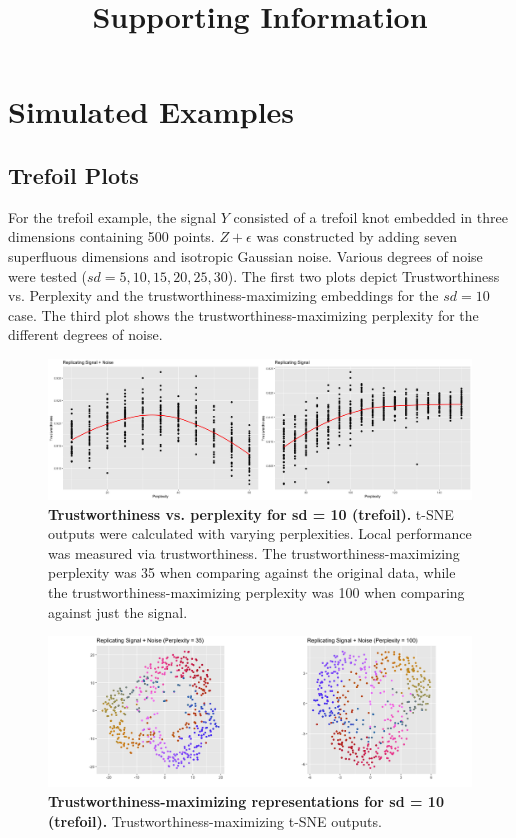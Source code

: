\documentclass{article}
\title{Supporting Information}
\date{}
\begin{document}
\maketitle		

\setcounter{section}{0}
\setcounter{figure}{0}
\renewcommand{\thesection}{S\Roman{section}}
\renewcommand{\thefigure}{S\arabic{figure}}

\section{Simulated Examples}
\subsection{Trefoil Plots}
For the trefoil example, the signal $Y$ consisted of a trefoil knot embedded in three dimensions containing 500 points. $Z + \epsilon$ was constructed by adding seven superfluous dimensions and isotropic Gaussian noise. Various degrees of noise were tested ($sd = 5, 10, 15, 20, 25, 30$). The first two plots depict Trustworthiness vs. Perplexity and the trustworthiness-maximizing embeddings for the $sd = 10$ case. The third plot shows the trustworthiness-maximizing perplexity for the different degrees of noise.

\begin{figure}[!h]
\centering
\includegraphics[scale=0.85]{Fig S1}
\caption{{\bf Trustworthiness vs. perplexity for sd = 10 (trefoil).}
t-SNE outputs were calculated with varying perplexities. Local performance was measured via trustworthiness. The trustworthiness-maximizing perplexity was 35 when comparing against the original data, while the trustworthiness-maximizing perplexity was 100 when comparing against just the signal.}
\end{figure}

\begin{figure}[H]
\centering
\includegraphics[scale=1.2]{Fig S2}
\caption{{\bf Trustworthiness-maximizing representations for sd = 10 (trefoil).}
Trustworthiness-maximizing t-SNE outputs.}
\end{figure}
\end{document}
